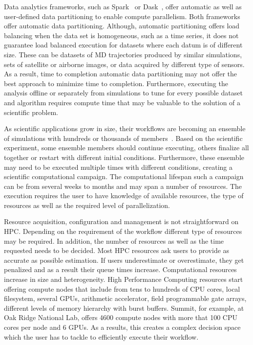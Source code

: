Data analytics frameworks, such as Spark~\cite{zaharia2010spark} or Dask~\cite{rocklin2015dask}, offer automatic as well as user-defined data partitioning to enable compute parallelism. Both frameworks offer automatic data partitioning. Although, automatic partitioning offers load balancing when the data set is homogeneous, such as a time series, it does not guarantee load balanced execution for datasets where each datum is of different size. These can be datasets of MD trajectories produced by similar simulations, sets of satellite or airborne images, or data acquired by different type of sensors. As a result, time to completion automatic data partitioning may not offer the best approach to minimize time to completion. Furthermore, executing the analysis offline or separately from simulations to tune for every possible dataset and algorithm requires compute time that may be valuable to the solution of a scientific problem.

As scientific applications grow in size, their workflows are becoming an ensemble of simulations with hundreds or thousands of members~\cite{malawski2015algorithms,rietmann2012forward}. Based on the scientific experiment, some ensemble members should continue executing, others finalize all together or restart with different initial conditions. Furthermore, these ensemble may need to be executed multiple times with different conditions, creating a  scientific computational campaign. The computational lifespan such a campaign can be from several weeks to months and may span a number of resources. The execution requires the user to have knowledge of available resources, the type of resources as well as the required level of parallelization.

Resource acquisition, configuration and management is not straightforward on HPC. Depending on the requirement of the workflow different type of resources may be required. In addition, the number of resources as well as the time requested needs to be decided. Most HPC resources ask users to provide as accurate as possible estimation. If users underestimate or overestimate, they get penalized and as a result their queue times increase. Computational resources increase in size and heterogeneity. High Performance Computing resources start offering compute nodes that include from tens to hundreds of CPU cores, local filesystem, several GPUs, arithmetic accelerator, field programmable gate arrays, different levels of memory hierarchy with burst buffers. Summit, for example, at Oak Ridge National Lab, offers 4600 compute nodes with more that 100 CPU cores per node and 6 GPUs. As a results, this creates a complex decision space which the user has to tackle to efficiently execute their workflow.

